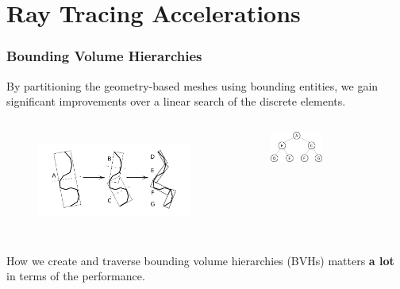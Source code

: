 \documentclass[12pt]{beamer}
\begin{document}
\section{Ray Tracing Accelerations} %


\begin{frame}
\frametitle{Bounding Volume Hierarchies}


By partitioning the geometry-based meshes using bounding entities, we gain significant improvements over a linear search of the discrete elements.
\begin{columns}
  \begin{figure}
    \centering
    \includegraphics[width=1.1\textwidth]{bvh_2d_ex_w_labels.png} 
    \cite{gottschalk1996obbtree}
  \end{figure}
  
  \begin{figure}
    \centering
    \includegraphics[width=0.5\textwidth]{binary_graph.png}
  \end{figure}
\end{columns}
\vfill
How we create and traverse bounding volume hierarchies (BVHs) matters \textbf{a lot} in terms of the performance.


\end{frame}
\end{document}
